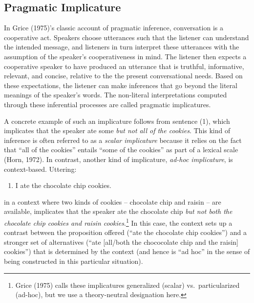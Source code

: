\documentclass[man]{apa6}
\providecommand{\tightlist}{%
  \setlength{\itemsep}{0pt}\setlength{\parskip}{0pt}}
\theoremstyle{definition}
\theoremstyle{definition}
\theoremstyle{definition}
\theoremstyle{remark}
\begin{document}
\subsection{Pragmatic Implicature}\label{pragmatic-implicature}

In Grice (1975)'s classic account of pragmatic inference, conversation
is a cooperative act. Speakers choose utterances such that the listener
can understand the intended message, and listeners in turn interpret
these utterances with the assumption of the speaker's cooperativeness in
mind. The listener then expects a cooperative speaker to have produced
an utterance that is truthful, informative, relevant, and concise,
relative to the the present conversational needs. Based on these
expectations, the listener can make inferences that go beyond the
literal meanings of the speaker's words. The non-literal interpretations
computed through these inferential processes are called pragmatic
implicatures.

A concrete example of such an implicature follows from sentence (1),
which implicates that the speaker ate some \emph{but not all of the
cookies}. This kind of inference is often referred to as a \emph{scalar
implicature} because it relies on the fact that \enquote{all of the
cookies} entails \enquote{some of the cookies} as part of a lexical
scale (Horn, 1972). In contrast, another kind of implicature,
\emph{ad-hoc implicature}, is context-based. Uttering:

\begin{enumerate}
\def\labelenumi{(\arabic{enumi})}
\setcounter{enumi}{1}
\tightlist
\item
  I ate the chocolate chip cookies.
\end{enumerate}

\noindent in a context where two kinds of cookies -- chocolate chip and
raisin -- are available, implicates that the speaker ate the chocolate
chip \emph{but not both the chocolate chip cookies and raisin
cookies}.\footnote{Grice (1975) calls these implicatures generalized
  (scalar) vs.~particularized (ad-hoc), but we use a theory-neutral
  designation here.} In this case, the context sets up a contrast
between the proposition offered (\enquote{ate the chocolate chip
cookies}) and a stronger set of alternatives (\enquote{ate {[}all/both
the chococolate chip and the raisin{]} cookies}) that is determined by
the context (and hence is \enquote{ad hoc} in the sense of being
constructed in this particular situation).
\end{document}
